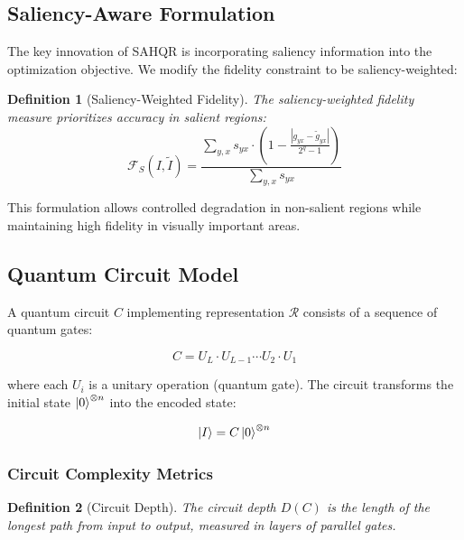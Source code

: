 \documentclass{ipol}
\newtheorem{definition}{Definition}
\begin{document}
\subsection{Saliency-Aware Formulation}

The key innovation of SAHQR is incorporating saliency information into the optimization objective. We modify the fidelity constraint to be saliency-weighted:

\begin{definition}[Saliency-Weighted Fidelity]
The saliency-weighted fidelity measure prioritizes accuracy in salient regions:
\begin{equation}
\mathcal{F}_S(I, \tilde{I}) = \frac{\sum_{y,x} s_{yx} \cdot \left(1 - \frac{|g_{yx} - \tilde{g}_{yx}|}{2^q - 1}\right)}{\sum_{y,x} s_{yx}}
\label{eq:saliency_fidelity}
\end{equation}
\end{definition}

This formulation allows controlled degradation in non-salient regions while maintaining high fidelity in visually important areas.

\subsection{Quantum Circuit Model}

A quantum circuit $C$ implementing representation $\mathcal{R}$ consists of a sequence of quantum gates:

\begin{equation}
C = U_L \cdot U_{L-1} \cdots U_2 \cdot U_1
\label{eq:circuit}
\end{equation}

where each $U_i$ is a unitary operation (quantum gate). The circuit transforms the initial state $\ket{0}^{\otimes n}$ into the encoded state:

\begin{equation}
\ket{I} = C \ket{0}^{\otimes n}
\label{eq:encoding}
\end{equation}

\subsubsection{Circuit Complexity Metrics}

\begin{definition}[Circuit Depth]
The circuit depth $D(C)$ is the length of the longest path from input to output, measured in layers of parallel gates.
\end{definition}
\end{document}
